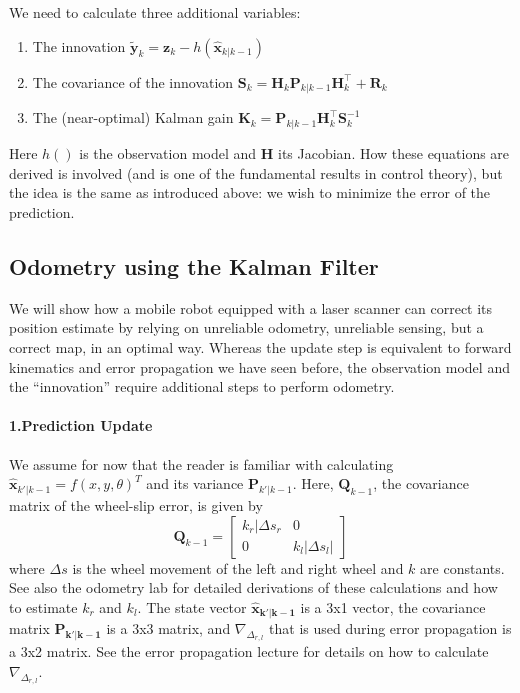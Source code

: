 We need to calculate three additional variables:
\begin{enumerate}
\item The innovation $ \tilde{\boldsymbol{y}}_{k}=\boldsymbol{z}_{k}-h(\hat{\boldsymbol{x}}_{k|k-1})$
\item The covariance of the innovation $\boldsymbol{S}_{k}={\boldsymbol{H}_{k}}\boldsymbol{P}_{k|k-1}{\boldsymbol{H}_{k}^\top}+\boldsymbol{R}_{k}$
\item The (near-optimal)  Kalman gain $ \boldsymbol{K}_{k}=\boldsymbol{P}_{k|k-1}{\boldsymbol{H}_{k}^\top}\boldsymbol{S}_{k}^{-1}$
\end{enumerate}
Here $ h()$ is the observation model and $ \boldsymbol{H}$ its Jacobian. How these equations are derived is involved (and is one of the fundamental results in control theory), but the idea is the same as introduced above: we wish to minimize the error of the prediction.

\subsection{Odometry using the Kalman Filter}
We will show how a mobile robot equipped with a laser scanner can correct its position estimate by relying on unreliable odometry, unreliable sensing, but a correct map, in an optimal way.
Whereas the update step is equivalent to forward kinematics and error propagation we have seen before, the observation model and the ``innovation'' require additional steps to perform odometry. 

\paragraph{1.Prediction Update}
We assume for now that the reader is familiar with calculating $ \hat{\boldsymbol{x}}_{k'|k-1}=f(x,y,\theta)^T$ and its variance $ \boldsymbol{P}_{k'|k-1}$. Here, $ \boldsymbol{Q}_{k-1}$, the covariance matrix of the wheel-slip error,  is given by
\begin{equation}
\boldsymbol{Q}_{k-1}=\left[\begin{array}{cc}k_r|\Delta s_r & 0\\0 & k_l|\Delta s_l|\end{array}\right]
\end{equation}
where $ \Delta s$ is the wheel movement of the left and right wheel and $ k$ are constants. See also the odometry lab for detailed derivations of these calculations and how to estimate $ k_r$ and $ k_l$.  The state vector $ \boldsymbol{\hat{x}_{k'|k-1}}$ is a 3x1 vector, the covariance matrix $ \boldsymbol{P_{k'|k-1}}$ is a 3x3 matrix, and $ \nabla_{\Delta_{r,l}}$ that is used during error propagation is a 3x2 matrix. See the error propagation lecture for details on how to calculate $ \nabla_{\Delta_{r,l}}$.

